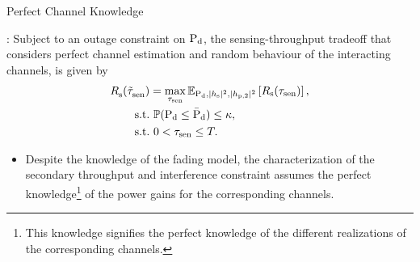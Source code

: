 \documentclass[12pt]{beamer}
\newcommand{\fs}[2]{\fontsize{#1 pt}{#2}\selectfont}
\begin{document}
\begin{frame}{Perfect Channel Knowledge}
        \fs{8}{8}
                \begin{center}
                \begin{mdframed}[style=MyFrame, frametitle=Ideal Model (IM)] : Subject to an outage constraint on $\text{P}_{\text{d}}$, the sensing-throughput tradeoff that considers perfect channel estimation and random behaviour of the interacting channels, is given by
                \begin{align*}
                        {R}_{\text{s}}^{\text{}}(\tilde{\tau}_{\text{sen}}^{\text{}}) &= \operatorname*{max}_{\tau_{\text{sen}}} {\mathbb E}_{\text{P}_{\text{d}}, |h_{\text{s}}|^2, |h_{\text{p,2}}|^2}\left[ R_{\text{s}}(\tau_{\text{sen}}) \right], \\
                        \text{s.t.} & \text{ }  \mathbb P( \text{P}_{\text{d}} \le \bar{\text{P}}_{\text{d}}) \le \kappa,  \\ 
                        \text{s.t.} & \text{ }  0 < \tau_{\text{sen}} \le T. 
                \end{align*} 
                \end{mdframed}
                \begin{itemize}
                \item {} Despite the knowledge of the fading model, the characterization of the secondary throughput and interference constraint assumes the perfect knowledge\footnote{This knowledge signifies the perfect knowledge of the different realizations of the corresponding channels.} of the power gains for the corresponding channels.
                \end{itemize}
                \end{center}
\end{frame}
\end{document}
